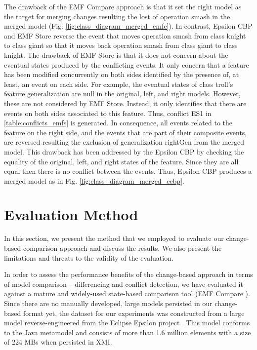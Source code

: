 The drawback of the EMF Compare approach is that it set the right model as the target for merging changes resulting the lost of operation \textsf{smash} in the merged model (Fig. \ref{fig:class_diagram_merged_emfc}). In contrast, Epsilon CBP and EMF Store reverse the event that moves operation \textsf{smash} from class \textsf{knight} to class \textsf{giant} so that it moves back operation \textsf{smash} from class \textsf{giant} to class \textsf{knight}. The drawback of EMF Store is that it does not concern about the eventual states produced by the conflicting events. It only concern that a feature has been modified concurrently on both sides identified by the presence of, at least, an event on each side. For example, the eventual states of class \textsf{troll}'s feature \textsf{generalization} are \textsf{null} in the original, left, and right models. However, these are not considered by EMF Store. Instead, it only identifies that there are events on both sides associated to this feature. Thus, conflict \textsf{ES1} in \ref{table:conflicts_emfs} is generated. In consequence, all events related to the feature on the right side, and the events that are part of their composite events, are reversed resulting the exclusion of generalization \textsf{rightGen} from the merged model. This drawback has been addressed by the Epsilon CBP by checking the equality of the original, left, and right states of the feature. Since they are all equal then there is no conflict between the events. Thus, Epsilon CBP produces a merged model as in Fig. \ref{fig:class_diagram_merged_ecbp}.
 

\section{Evaluation Method}
\label{sec:evaluation}
In this section, we present the method that we employed to evaluate our change-based comparison approach and discuss the results. We also present the limitations and threats to the validity of the evaluation.

In order to assess the performance benefits of the change-based approach in terms of model comparison -- differencing and conflict detection, we have evaluated it against a mature and widely-used state-based comparison tool (EMF Compare \cite{emfcompare2018developer,eclipse2017compare}). Since there are no manually developed, large models persisted in our change-based format yet, the dataset for our experiments was constructed from a large model reverse-engineered from the Eclipse Epsilon project \cite{eclipse2018epsilongit,eclipse2017epsilon}. This model conforms to the Java metamodel \cite{eclipse2018modiscojava} and consists of more than 1.6 million elements with a size of 224 MBs when persisted in XMI. 

